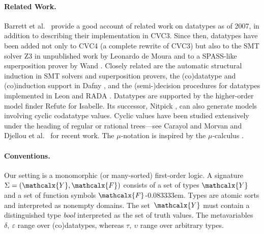 \documentclass[smallcondensed,draft]{svjour3}
\newcommand\Sig{\mathrm{\Sigma}}
\newcommand\ty[1]{\textit{#1}}
\newcommand\Types{\mathcalx{Y}}
\newcommand\Funcs{\mathcalx{F}}
\newcommand\negvthinspace{\kern-0.083333em}
\begin{document}
\paragraph{Related Work.} Barrett
et al.\ \cite{barrett-et-al-2007} provide a good account of
related work on datatypes as of 2007, in addition to describing their
implementation in CVC3.
Since then, datatypes have been added not only to CVC4 (a complete rewrite of CVC3)
but also to the SMT solver
Z3 \cite{de-moura-bjoerner-2008} in unpublished work by Leonardo de Moura and to a SPASS-like %
superposition prover by Wand \cite{wand-2014}.
Closely related are the automatic structural
induction in SMT solvers
\cite{reynolds-kuncak-2014}
and superposition provers\cite{kersani-peltier-2013,cruanes-2015},
the (co)datatype and (co)induction support in Dafny \cite{leino-moskal-2014},
and the (\hbox{semi-})decision procedures for datatypes
implemented in Leon \cite{suter-et-al-2011} and RADA \cite{pham-et-al-2013}.
%
Datatypes are supported by the higher-order model finder Refute
\cite{weber-2008} for Isabelle. Its successor, Nitpick
\cite{blanchette-nipkow-2010}, can also generate models involving cyclic
codatatype values. Cyclic values have been studied extensively under the heading
of regular or rational trees---see Carayol and Morvan
\cite{carayol-morvan-2006} and Djellou et al.\ \cite{djelloul-et-al-2008}
for recent work.
The $\mu$-notation is inspired by the $\mu$-calculus
\cite[etc.]{kozen-1983,endrullis-et-al-2011}.



%

\paragraph{Conventions.}
Our setting is a monomorphic (or many-sorted) first-order logic.
A signature $\Sig = (\Types, \Funcs)$ consists of a set of types $\Types$ and a
set of function symbols $\Funcs$\negvthinspace. Types are atomic sorts and interpreted as
nonempty domains. The set~$\Types$ must contain a
distinguished type \ty{bool} interpreted as the set of truth
values. %
The metavariables $\delta,\:\varepsilon$ range over (co)datatypes,
whereas $\tau,\:\upsilon$ range over arbitrary types.
\end{document}
